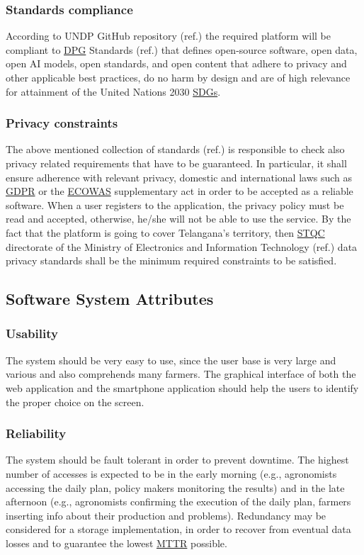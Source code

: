 \subsubsection{Standards compliance}

According to UNDP GitHub repository (ref.\cite{UNDP_GitHub}) the required platform will be compliant to \hyperref[tab:acronymsTable]{DPG} Standards (ref.\cite{DPGS}) that defines open-source software, open data, open AI models, open standards, and open content that adhere to privacy and other applicable best practices, do no harm by design and are of high relevance for attainment of the United Nations 2030 \hyperref[tab:acronymsTable]{SDGs}.

\subsubsection{Privacy constraints}
The above mentioned collection of standards (ref.\cite{DPGS}) is responsible to check also privacy related requirements that have to be guaranteed. In particular, it shall ensure adherence with relevant privacy, domestic and international laws such as \hyperref[tab:acronymsTable]{GDPR} or the \hyperref[tab:acronymsTable]{ECOWAS} supplementary act  in order to be accepted as a reliable software. When a user registers to the application, the privacy policy must be read and accepted, otherwise, he/she will not be able to use the service. By the fact that the platform is going to cover Telangana's territory, then \hyperref[tab:acronymsTable]{STQC} directorate of the Ministry of Electronics and Information Technology (ref.\cite{DPGS}) data privacy standards shall be the minimum required constraints to be satisfied.




\subsection{Software System Attributes}
\label{sec:sw_sys_attributes}
\subsubsection{Usability}
The system should be very easy to use, since the user base is very large and various and also comprehends many farmers. The graphical interface of both the web application and the smartphone application should help the users to identify the proper choice on the screen.
\subsubsection{Reliability}
The system should be fault tolerant in order to prevent downtime. The highest number of accesses is expected to be in the early morning (e.g., agronomists accessing the daily plan, policy makers monitoring the results) and in the late afternoon (e.g., agronomists confirming the execution of the daily plan, farmers inserting info about their production and problems).
\newline
Redundancy may be considered for a storage implementation, in order to recover from eventual data losses and to guarantee the lowest \hyperref[tab:acronymsTable]{MTTR} possible.

